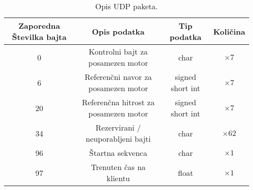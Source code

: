 
\begin{table}[h]
	\centering
	\begin{footnotesize}
		\begin{tabular}{|c c c c|}
		Zaporedna \v{S}tevilka bajta & Opis podatka & Tip podatka &  Koli\v{c}ina\\ \hline
		0 & Kontrolni bajt za posamezen motor & char & $\times 7$ \\
		6 & Referen\v{c}ni navor za posamezen motor & signed short int & $\times 7$ \\
		20 & Referen\v{c}na hitrost za posamezen motor & signed short int & $\times 7$ \\
		34 & Rezervirani / neuporabljeni bajti & char & $\times 62$ \\
		96 & \v{S}tartna sekvenca & char & $\times 1$\\
		97 & Trenuten \v{c}as na klientu & float & $\times 1$\\ \hline
		\end{tabular}
	\end{footnotesize}
	\caption{Opis UDP paketa.}
	\label{table:udp-command}
\end{table}